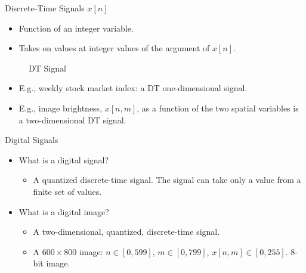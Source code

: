 %




\begin{frame}[plain]{Discrete-Time Signals $x[n]$}
    \begin{itemize}
        \item Function of an integer variable.
        \item Takes on values at integer values of the argument of $x[n]$.
    \end{itemize}
    \begin{figure}
      \centering
      
      \caption{DT Signal}\label{fi:dt_signal}
    \end{figure}
    \begin{itemize}
        \item E.g., weekly stock market index: a DT one-dimensional signal.
        \item E.g., image brightness,  $x[n,m]$,  as a function of the two spatial variables is a two-dimensional DT signal.
    \end{itemize}
\end{frame}

\begin{frame}{Digital Signals}
    \begin{itemize}
      \item What is a digital signal?
        \begin{itemize}
            \item A quantized discrete-time signal. The signal can take only a value from a finite set of values.
        \end{itemize}

      \item What is a digital image?
        \begin{itemize}
            \item A two-dimensional, quantized, discrete-time signal.
            \item A $600 \times 800$ image: $n \in [0, 599]$, $m \in [0, 799]$, $x[n,m] \in [0,255]$. 8-bit image.
        \end{itemize}
    \end{itemize}
\end{frame}

